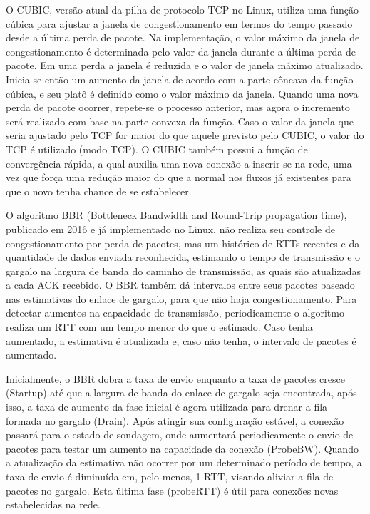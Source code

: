 \documentclass{article}
\begin{document}
O CUBIC, versão atual da pilha de protocolo TCP no Linux, utiliza uma função cúbica para ajustar a janela de
congestionamento em termos do tempo passado desde a última perda de pacote. Na implementação, o valor máximo da janela
de congestionamento é determinada pelo valor da janela durante a última perda de pacote. Em uma perda a janela é
reduzida e o valor de janela máximo atualizado. Inicia-se então um aumento da janela de acordo com a parte côncava da
função cúbica, e seu platô é definido como o valor máximo da janela. Quando uma nova perda de pacote ocorrer, repete-se
o processo anterior, mas agora o incremento será realizado com base na parte convexa da função. Caso o valor da janela
que seria ajustado pelo TCP for maior do que aquele previsto pelo CUBIC, o valor do TCP é utilizado (modo TCP). O CUBIC
também possui a função de convergência rápida, a qual auxilia uma nova conexão a inserir-se na rede, uma vez que força
uma redução maior do que a normal nos fluxos já existentes para que o novo tenha chance de se estabelecer.

O algoritmo BBR (Bottleneck Bandwidth and Round-Trip propagation time), publicado em 2016 e já implementado no Linux,
não realiza seu controle de congestionamento por perda de pacotes, mas um histórico de RTTs recentes e da quantidade de
dados enviada reconhecida, estimando o tempo de transmissão e o gargalo na largura de banda do caminho de transmissão,
as quais são atualizadas a cada ACK recebido. O BBR também dá intervalos entre seus pacotes baseado nas estimativas do
enlace de gargalo, para que não haja congestionamento. Para detectar aumentos na capacidade de transmissão,
periodicamente o algoritmo realiza um RTT com um tempo menor do que o estimado. Caso tenha aumentado, a estimativa é
atualizada e, caso não tenha, o intervalo de pacotes é aumentado.

Inicialmente, o BBR dobra a taxa de envio enquanto a taxa de pacotes cresce (Startup) até que a largura de banda do
enlace de gargalo seja encontrada, após isso, a taxa de aumento da fase inicial é agora utilizada para drenar a fila
formada no gargalo (Drain). Após atingir sua configuração estável, a conexão passará para o estado de sondagem, onde
aumentará periodicamente o envio de pacotes para testar um aumento na capacidade da conexão (ProbeBW). Quando a
atualização da estimativa não ocorrer por um determinado período de tempo, a taxa de envio é diminuída em, pelo menos, 1
RTT, visando aliviar a fila de pacotes no gargalo. Esta última fase (probeRTT) é útil para conexões novas estabelecidas
na rede.
\end{document}
